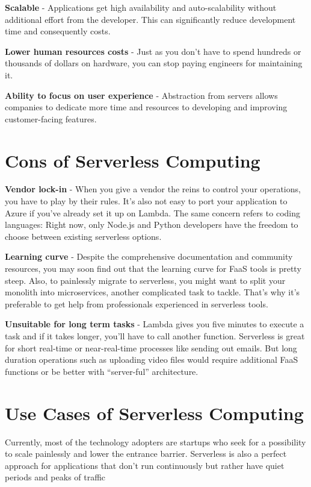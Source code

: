\textbf{Scalable} - Applications get high availability and auto-scalability without additional effort from the developer.
This can significantly reduce development time and consequently costs.

\textbf{Lower human resources costs} - Just as you don’t have to spend hundreds or thousands of dollars on
hardware, you can stop paying engineers for maintaining it.

\textbf{Ability to focus on user experience} - Abstraction from servers allows companies to dedicate more time and
resources to developing and improving customer-facing features.

\section{Cons of Serverless Computing}

\textbf{Vendor lock-in} - When you give a vendor the reins to control your operations, you have to play by their
rules. It’s also not easy to port your application to Azure if you’ve already set it up on Lambda. The same
concern refers to coding languages: Right now, only Node.js and Python developers have the freedom to
choose between existing serverless options.

\textbf{Learning curve} - Despite the comprehensive documentation and community resources, you may soon find
out that the learning curve for FaaS tools is pretty steep. Also, to painlessly migrate to serverless, you might
want to split your monolith into microservices, another complicated task to tackle. That’s why it’s preferable
to get help from professionals experienced in serverless tools.

\textbf{Unsuitable for long term tasks} - Lambda gives you five minutes to execute a task and if it takes longer,
you’ll have to call another function. Serverless is great for short real-time or near-real-time processes like 
sending out emails. But long duration operations such as uploading video files would require additional FaaS
functions or be better with “server-ful” architecture.

\section{Use Cases of Serverless Computing}

Currently, most of the technology adopters are startups who seek for a possibility to scale painlessly and
lower the entrance barrier. Serverless is also a perfect approach for applications that don’t run continuously
but rather have quiet periods and peaks of traffic

